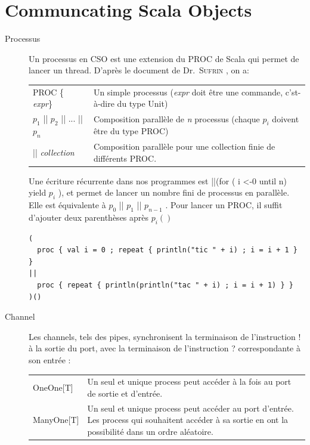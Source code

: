 \documentclass[a4paper,11pt,french]{report}
\begin{document}
\section{Communcating Scala Objects}
\begin{description}
\item[Processus] Un processus en CSO est une extension du PROC de Scala qui permet de lancer un thread. D'après le document de Dr.\ \textsc{Sufrin} \cite{cpa2008-cso}, on a:
\begin{center}
\begin{tabular}{lp{}}
\textsc{PROC} \{ \emph{expr}\} & Un simple processus (\emph{expr} doit être une commande, c'st-à-dire du type \textsf{Unit})\\ 
\emph{$p_{1}$} || \emph{$p_{2}$} || ... || \emph{$p_{n}$}  & Composition parallèle de \emph{n} processus (chaque \emph{$p_{i}$} doivent être du type \textsc{PROC})\\
|| \emph{collection} & Composition parallèle pour une collection finie de différents \textsc{PROC}. \\ 
\end{tabular} 
\end{center}
Une écriture récurrente dans nos programmes est \textsf{||(for ( i <-0 until n) yield $p_{i}$ )}, et permet de lancer un nombre fini de processus en parallèle. Elle est équivalente à \textsf{ $p_{0}$ ||  $p_{1}$ ||  $p_{n-1}$ }.
Pour lancer un \textsc{PROC}, il suffit d'ajouter deux parenthèses après \textsf{$p_i()$}

\begin{lstlisting}[frame=trBL]
( 
  proc { val i = 0 ; repeat { println("tic " + i) ; i = i + 1 } }
|| 
  proc { repeat { println(println("tac " + i) ; i = i + 1) } }
)()
\end{lstlisting}

\item[Channel] Les \textsf{channels}, tels des pipes, synchronisent la terminaison de l'instruction \textsf{!} à la sortie du port, avec la terminaison de l'instruction \textsf{?} correspondante à son entrée :

\begin{center}
\begin{tabular}{lp{}}
\textsf{OneOne[T]} & Un seul et unique process peut accéder à la fois au port de sortie et d'entrée.\\

\textsf{ManyOne[T]} & Un seul et unique process peut accéder au port d'entrée. Les process qui souhaitent accéder à sa sortie en ont la possibilité dans un ordre aléatoire.\\


\end{tabular}
\end{center}
\end{description}
\end{document}
